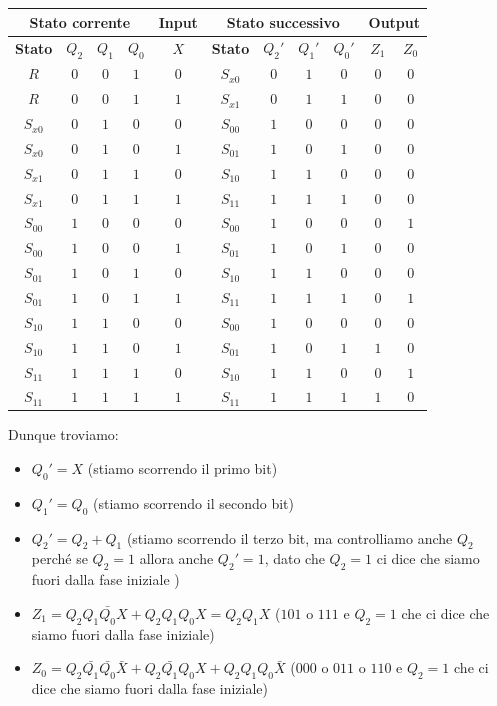 \documentclass[11pt, a4paper, titlepage, oneside]{scrbook}
\begin{document}
\begin{table}[H]
  \centering
  \begin{tabular}{|c|c|c|c|c|c|c|c|c|c|c|}
    \hline
    \multicolumn{4}{|c|}{\textbf{Stato corrente}}  & \textbf{Input} & \multicolumn{4}{c|}{\textbf{Stato successivo}} & \multicolumn{2}{c|}{\textbf{Output}} \\
    \hline
    \textbf{Stato} & $Q_2$ & $Q_1$ & $Q_0$ & $X$ & \textbf{Stato} & $Q_2'$ & $Q_1'$ & $Q_0'$ & $Z_1$ & $Z_0$ \\ \hline
    $R$ & $0$ & $0$ & $1$ & $0$ & $S_{x0}$ & $0$ & $1$ & $0$ & $0$ & $0$ \\
    $R$ & $0$ & $0$ & $1$ & $1$ & $S_{x1}$ & $0$ & $1$ & $1$ & $0$ & $0$ \\
    $S_{x0}$ & $0$ & $1$ & $0$ & $0$ & $S_{00}$ & $1$ & $0$ & $0$ & $0$ & $0$ \\
    $S_{x0}$ & $0$ & $1$ & $0$ & $1$ & $S_{01}$ & $1$ & $0$ & $1$ & $0$ & $0$ \\
    $S_{x1}$ & $0$ & $1$ & $1$ & $0$ & $S_{10}$ & $1$ & $1$ & $0$ & $0$ & $0$ \\
    $S_{x1}$ & $0$ & $1$ & $1$ & $1$ & $S_{11}$ & $1$ & $1$ & $1$ & $0$ & $0$ \\
    $S_{00}$ & $1$ & $0$ & $0$ & $0$ & $S_{00}$ & $1$ & $0$ & $0$ & $0$ & $1$ \\
    $S_{00}$ & $1$ & $0$ & $0$ & $1$ & $S_{01}$ & $1$ & $0$ & $1$ & $0$ & $0$ \\
    $S_{01}$ & $1$ & $0$ & $1$ & $0$ & $S_{10}$ & $1$ & $1$ & $0$ & $0$ & $0$ \\
    $S_{01}$ & $1$ & $0$ & $1$ & $1$ & $S_{11}$ & $1$ & $1$ & $1$ & $0$ & $1$ \\
    $S_{10}$ & $1$ & $1$ & $0$ & $0$ & $S_{00}$ & $1$ & $0$ & $0$ & $0$ & $0$ \\
    $S_{10}$ & $1$ & $1$ & $0$ & $1$ & $S_{01}$ & $1$ & $0$ & $1$ & $1$ & $0$ \\
    $S_{11}$ & $1$ & $1$ & $1$ & $0$ & $S_{10}$ & $1$ & $1$ & $0$ & $0$ & $1$ \\
    $S_{11}$ & $1$ & $1$ & $1$ & $1$ & $S_{11}$ & $1$ & $1$ & $1$ & $1$ & $0$ \\
    \hline
  \end{tabular}
\end{table}

Dunque troviamo:
\begin{itemize}
    \item $Q_0' = X$ (stiamo scorrendo il primo bit)
    \item $Q_1' = Q_0$ (stiamo scorrendo il secondo bit)
    \item $Q_2' = Q_2 + Q_1$ (stiamo scorrendo il terzo bit, ma controlliamo anche $Q_2$ perché se $Q_2 = 1$ allora anche $Q_2' = 1$, dato che $Q_2 = 1$ ci dice che siamo fuori dalla fase iniziale )
    \item $Z_1 = Q_2 Q_1 \bar{Q_0}X + Q_2 Q_1 Q_0 X = Q_2 Q_1 X$ ($101$ o $111$ e $Q_2 = 1$ che ci dice che siamo fuori dalla fase iniziale)
    \item $Z_0 = Q_2 \bar{Q_1} \bar{Q_0} \bar{X} + Q_2 \bar{Q_1} Q_0 X + Q_2 Q_1 Q_0 \bar{X}$ ($000$ o $011$ o $110$  e $Q_2 = 1$ che ci dice che siamo fuori dalla fase iniziale)
\end{itemize}
\end{document}
